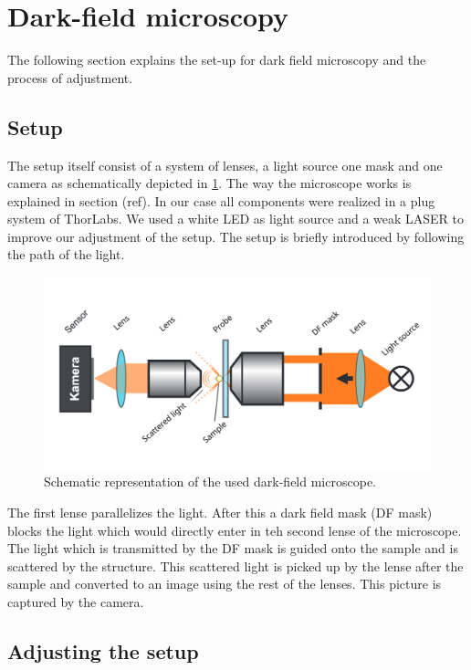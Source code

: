 \section{Dark-field microscopy}
\label{sec:DarkFMicro}

The following section explains the set-up for dark field microscopy and the process of adjustment. 

\subsection{Setup}

The setup itself consist of a system of lenses, a light source one mask and one camera as schematically depicted in \cref{fig:DarkFMicro}.
The way the microscope works is explained in section (ref). In our case all components were realized in a plug system of ThorLabs. We used a white LED as light source and a weak LASER to improve our adjustment of the setup. 
The setup is briefly introduced by following the path of the light. 

\begin{figure}[ht]
    \centering
    \includegraphics[width = \linewidth]{Bilder/Setup/MikroskopEdit.png}
    \caption{Schematic representation of the used dark-field microscope.}
    \label{fig:DarkFMicro}
\end{figure}

The first lense parallelizes the light. After this a dark field mask (DF mask) blocks the light which would directly enter in teh second lense of the microscope. The light which is transmitted by the DF mask is guided onto the sample and 
is scattered by the structure. This scattered light is picked up by the lense after the sample and converted to an image using the rest of the lenses. This picture is captured by the camera.

\subsection{Adjusting the setup}

